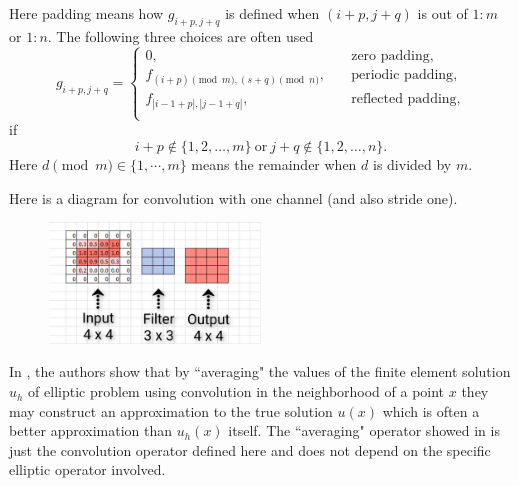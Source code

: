 Here padding means how $ g_{i+ p, j + q}$ is defined
when $(i+ p, j + q)$ is out of $1:m$ or $1:n$. 
The following three choices are often used
\begin{equation}\label{eq:padding}
g_{i + p, j + q} = \begin{cases}
0,  \quad &\text{zero padding}, \\
f_{(i + p)\pmod{m}, (s + q)\pmod{n}},  \quad &\text{periodic padding}, \\
f_{|i-1 +p|, |j -1  +q|},  \quad &\text{reflected padding}, \\
\end{cases}
\end{equation}
if 
\begin{equation}
i + p \notin \{1, 2, \dots, m\} ~\text{or} ~  j+ q \notin \{1, 2, \dots, n\}.
\end{equation}
Here $ d \pmod{m} \in \{1, \cdots, m\} $  means the remainder when $d$ is divided by $m$.

Here is a diagram for convolution with one channel (and also stride one).
\begin{figure}[H]
	\begin{center}
		\includegraphics[width=0.5\textwidth]{figures/Conv0padding}
	\end{center}
\end{figure}  
In \cite{bramble1977higher}, the authors show that by ``averaging" the values of 
the finite element solution $u_h$ of elliptic problem using convolution  
 in the neighborhood of a point $x$ they may construct an approximation to the true solution $u(x)$ 
 which is often a better approximation than $u_h(x)$ itself. The ``averaging" operator showed in \cite{bramble1977higher} 
 is just the convolution operator defined here and does not depend on the specific elliptic operator involved.


